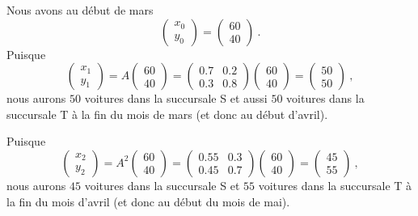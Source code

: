 {Nous avons au début de mars
\[
\begin{pmatrix} x_0 \\ y_0 \end{pmatrix} =
\begin{pmatrix} 60 \\ 40 \end{pmatrix} \ .
\]
Puisque
\[
\begin{pmatrix} x_1 \\ y_1 \end{pmatrix}
= A \begin{pmatrix} 60 \\ 40 \end{pmatrix}
= \begin{pmatrix} 0.7 & 0.2 \\ 0.3 & 0.8  \end{pmatrix}
\begin{pmatrix} 60 \\ 40 \end{pmatrix}
= \begin{pmatrix} 50 \\ 50 \end{pmatrix} \ ,
\]
nous aurons $50$ voitures dans la succursale S et aussi $50$ voitures dans la
succursale T à la fin du mois de mars (et donc au début d'avril).

Puisque
\[
\begin{pmatrix} x_2 \\ y_2 \end{pmatrix}
= A^2 \begin{pmatrix} 60 \\ 40 \end{pmatrix}
= \begin{pmatrix} 0.55 & 0.3 \\ 0.45 & 0.7  \end{pmatrix}
\begin{pmatrix} 60 \\ 40 \end{pmatrix}
=
\begin{pmatrix} 45 \\ 55 \end{pmatrix} \ ,
\]
nous aurons $45$ voitures dans la succursale S et $55$ voitures dans la
succursale T à la fin du mois d'avril (et donc au début du mois de mai).

}
